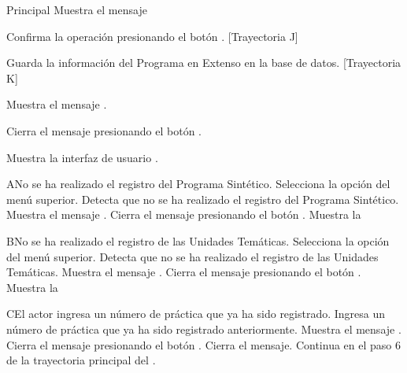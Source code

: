 \begin{UCtrayectoria}{Principal}
    \UCpaso Muestra el mensaje 

    \UCpaso[\UCactor] Confirma la operación presionando el botón . [Trayectoria J]
    
    \UCpaso Guarda la información del Programa en Extenso en la base de datos. [Trayectoria K]
    
    \UCpaso Muestra el mensaje .
    
    \UCpaso[\UCactor] Cierra el mensaje presionando el botón .
    
    \UCpaso Muestra la interfaz de usuario .
\end{UCtrayectoria}


\begin{UCtrayectoriaA}{A}{No se ha realizado el registro del Programa Sintético.}
    \UCpaso[\UCactor] Selecciona la opción  del menú superior.
    \UCpaso Detecta que no se ha realizado el registro del Programa Sintético.
        \UCpaso Muestra el mensaje .
    \UCpaso[\UCactor] Cierra el mensaje presionando el botón .
    \UCpaso Muestra la 
\end{UCtrayectoriaA}


\begin{UCtrayectoriaA}{B}{No se ha realizado el registro de las Unidades Temáticas.}
    \UCpaso[\UCactor] Selecciona la opción  del menú superior.
    \UCpaso Detecta que no se ha realizado el registro de las Unidades Temáticas.
        \UCpaso Muestra el mensaje .
    \UCpaso[\UCactor] Cierra el mensaje presionando el botón .
    \UCpaso Muestra la 
\end{UCtrayectoriaA}


\begin{UCtrayectoriaA}{C}{El actor ingresa un número de práctica que ya ha sido registrado.}
    \UCpaso[\UCactor] Ingresa un número de práctica que ya ha sido registrado anteriormente.
    \UCpaso Muestra el mensaje .
    \UCpaso[\UCactor] Cierra el mensaje presionando el botón .
    \UCpaso Cierra el mensaje. 
    \UCpaso Continua en el paso 6 de la trayectoria principal del .
\end{UCtrayectoriaA}

